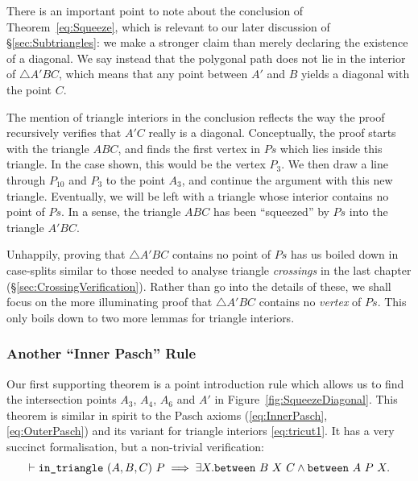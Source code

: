 There is an important point to note about the conclusion of Theorem~\ref{eq:Squeeze}, which is relevant to our later discussion of \S\ref{sec:Subtriangles}: we make a stronger claim than merely declaring the existence of a diagonal. We say instead that the polygonal path does not lie in the interior of $\triangle A'BC$, which means that any point between $A'$ and $B$ yields a diagonal with the point $C$. %

The mention of triangle interiors in the conclusion reflects the way the proof recursively verifies that $A'C$ really is a diagonal. Conceptually, the proof starts with the triangle $ABC$, and finds the first vertex in $Ps$ which lies inside this triangle. In the case shown, this would be the vertex $P_3$. We then draw a line through $P_{10}$ and $P_3$ to the point $A_3$, and continue the argument with this new triangle. Eventually, we will be left with a triangle whose interior contains no point of $Ps$. In a sense, the triangle $ABC$ has been ``squeezed'' by $Ps$ into the triangle $A'BC$.

Unhappily, proving that $\triangle A'BC$ contains no point of $Ps$ has us boiled down in case-splits similar to those needed to analyse triangle \emph{crossings} in the last chapter (\S\ref{sec:CrossingVerification}). Rather than go into the details of these, we shall focus on the more illuminating proof that $\triangle A'BC$ contains no \emph{vertex} of $Ps$. This only boils down to two more lemmas for triangle interiors.

\subsubsection{Another ``Inner Pasch'' Rule}
Our first supporting theorem is a point introduction rule which allows us to find the intersection points $A_3$, $A_4$, $A_6$ and $A'$ in Figure~\ref{fig:SqueezeDiagonal}. This theorem is similar in spirit to the Pasch axioms (\ref{eq:InnerPasch}, \ref{eq:OuterPasch}) and its variant for triangle interiors \eqref{eq:tricut1}. It has a very succinct formalisation, but a non-trivial verification:
\begin{equation}\label{eq:TriCut3}
\vdash\texttt{in\_triangle}\ (A,B,C)\ P \implies \exists X. \texttt{between}\ B\ X\ C \wedge \texttt{between}\ A\ P\ X.
\end{equation}

